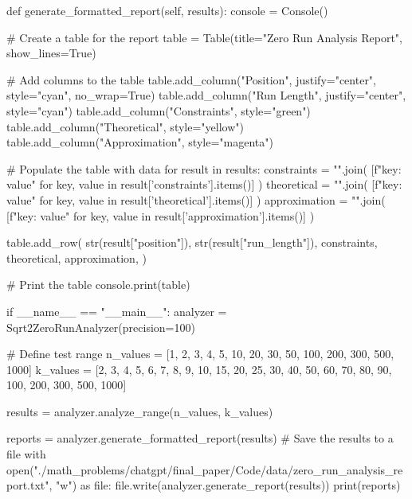     def generate_formatted_report(self, results):
        console = Console()

        # Create a table for the report
        table = Table(title="Zero Run Analysis Report", show_lines=True)
        
        # Add columns to the table
        table.add_column("Position", justify="center", style="cyan", no_wrap=True)
        table.add_column("Run Length", justify="center", style="cyan")
        table.add_column("Constraints", style="green")
        table.add_column("Theoretical", style="yellow")
        table.add_column("Approximation", style="magenta")

        # Populate the table with data
        for result in results:
            constraints = "\n".join(
                [f"{key}: {value}" for key, value in result['constraints'].items()]
            )
            theoretical = "\n".join(
                [f"{key}: {value}" for key, value in result['theoretical'].items()]
            )
            approximation = "\n".join(
                [f"{key}: {value}" for key, value in result['approximation'].items()]
            )

            table.add_row(
                str(result["position"]),
                str(result["run_length"]),
                constraints,
                theoretical,
                approximation,
            )
        
        # Print the table
        console.print(table)

if __name__ == "__main__":
    analyzer = Sqrt2ZeroRunAnalyzer(precision=100)

    # Define test range
    n_values = [1, 2, 3, 4, 5, 10, 20, 30, 50, 100, 200, 300, 500, 1000] 
    k_values = [2, 3, 4, 5, 6, 7, 8, 9, 10, 15, 20, 25, 30, 40, 50, 60, 70, 80, 90, 100, 200, 300, 500, 1000]

    results = analyzer.analyze_range(n_values, k_values)

    reports = analyzer.generate_formatted_report(results)
    # Save the results to a file
    with open("./math_problems/chatgpt/final_paper/Code/data/zero_run_analysis_report.txt", "w") as file:
        file.write(analyzer.generate_report(results))
    print(reports)
